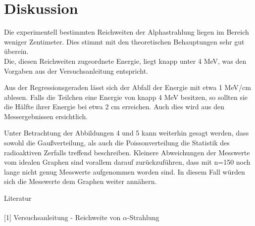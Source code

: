 \section{Diskussion}
Die experimentell bestimmten Reichweiten der Alphastrahlung liegen im Bereich weniger Zentimeter. Dies stimmt mit den theoretischen Behauptungen sehr gut überein.\\
Die, diesen Reichweiten zugeordnete Energie, liegt knapp unter 4 MeV, was den Vorgaben aus der Versuchsanleitung entspricht.

Aus der Regressionsgeraden lässt sich der Abfall der Energie mit etwa 1 MeV/cm ablesen. Falls die Teilchen eine Energie von knapp 4 MeV besitzen, so sollten sie die Hälfte ihrer Energie bei etwa 2 cm erreichen. Auch dies wird aus den Messergebnissen ersichtlich.

Unter Betrachtung der Abbildungen 4 und 5 kann weiterhin gesagt werden, dass sowohl die Gaußverteilung, als auch die Poissonverteilung die Statistik des radioaktiven Zerfalls treffend beschreiben. Kleinere Abweichungen der Messwerte vom idealen Graphen sind vorallem darauf zurückzuführen, dass mit n=150 noch lange nicht genug Messwerte aufgenommen worden sind. In diesem Fall würden sich die Messwerte dem Graphen weiter annähern.


\parskip 300pt
\Large{Literatur}\\\\
\large{[1] Versuchsanleitung - Reichweite von $\alpha$-Strahlung}\\\\




